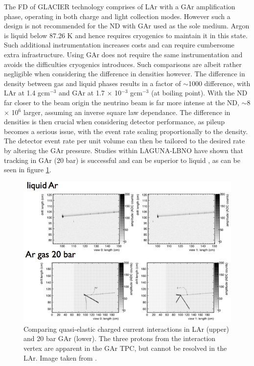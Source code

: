 The FD of GLACIER technology comprises of LAr with a GAr amplification phase, operating in both charge and light collection modes. However such a design is not recommended for the ND with GAr used as the sole medium. Argon is liquid below 87.26 K and hence requires cryogenics to maintain it in this state. Such additional instrumentation increases costs and can require cumbersome extra infrastructure. Using GAr does not require the same instrumentation and avoids the difficulties cryogenics introduces. Such comparisons are albeit rather negligible when considering the difference in densities however. The difference in density between gas and liquid phases results in a factor of $\sim$1000 difference, with LAr at 1.4 gcm$^{-3}$ and GAr at 1.7 $\times$ 10$^{-3}$ gcm$^{-3}$ (at boiling point). With the ND far closer to the beam origin the neutrino beam is far more intense at the ND, $\sim$8 $\times$ 10$^{6}$ larger, assuming an inverse square law dependance. The difference in densities is then crucial when considering detector performance, as pileup becomes a serious issue, with the event rate scaling proportionally to the density. The detector event rate per unit volume can then be tailored to the desired rate by altering the GAr pressure. Studies within LAGUNA-LBNO have shown that tracking in GAr (20 bar) is successful and can be superior to liquid \cite{lbnoInternalCurioni}, as can be seen in figure \ref{fig:GArVsLAr}.

\begin{figure}[hbtp]
	\begin{center}
		\includegraphics[width=150mm]{Chapter3/figures/liquid-gas-argon1-1.png}
	\caption{Comparing quasi-elastic charged current interactions in LAr (upper) and 20 bar GAr (lower). The three protons from the interaction vertex are apparent in the GAr TPC, but cannot be resolved in the LAr. Image taken from \cite{lbnoNDTechNote}.}
	\label{fig:GArVsLAr}
	\end{center}
\end{figure}

